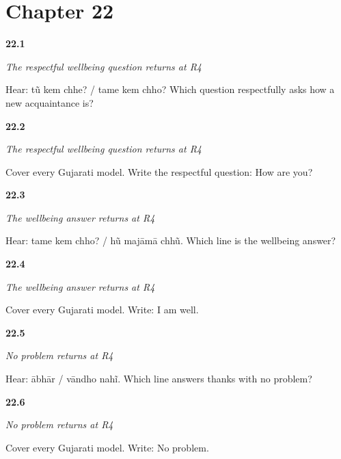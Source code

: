 \section*{Chapter 22}

\noindent\begin{minipage}[t]{\linewidth}
\raggedright
\hypertarget{review-GU-R18-how-are-you-r4-listening}{\textbf{22.1}} \emph{The respectful wellbeing question returns at R4}\par
\small Hear: tũ kem chhe? / tame kem chho? Which question respectfully asks how a new acquaintance is?
\end{minipage}\par\medskip

\noindent\begin{minipage}[t]{\linewidth}
\raggedright
\hypertarget{review-GU-R18-how-are-you-r4-writing}{\textbf{22.2}} \emph{The respectful wellbeing question returns at R4}\par
\small Cover every Gujarati model. Write the respectful question: How are you?
\end{minipage}\par\medskip

\noindent\begin{minipage}[t]{\linewidth}
\raggedright
\hypertarget{review-GU-R18-majaa-r4-listening}{\textbf{22.3}} \emph{The wellbeing answer returns at R4}\par
\small Hear: tame kem chho? / hũ majāmā chhũ. Which line is the wellbeing answer?
\end{minipage}\par\medskip

\noindent\begin{minipage}[t]{\linewidth}
\raggedright
\hypertarget{review-GU-R18-majaa-r4-writing}{\textbf{22.4}} \emph{The wellbeing answer returns at R4}\par
\small Cover every Gujarati model. Write: I am well.
\end{minipage}\par\medskip

\noindent\begin{minipage}[t]{\linewidth}
\raggedright
\hypertarget{review-GU-R18-no-problem-r4-listening}{\textbf{22.5}} \emph{No problem returns at R4}\par
\small Hear: ābhār / vāndho nahĩ. Which line answers thanks with no problem?
\end{minipage}\par\medskip

\noindent\begin{minipage}[t]{\linewidth}
\raggedright
\hypertarget{review-GU-R18-no-problem-r4-writing}{\textbf{22.6}} \emph{No problem returns at R4}\par
\small Cover every Gujarati model. Write: No problem.
\end{minipage}\par\medskip


